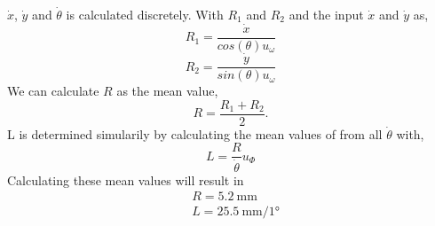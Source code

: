 \documentclass[a4paper,12pt,oneside,onecolumn]{article} %
\begin{document}
$\dot{x}$, $\dot{y}$ and $\dot{\theta}$ is calculated discretely. With
$R_1$ and $R_2$ and the input $\dot{x}$ and $\dot{y}$
as,
	\begin{equation}
		R_1 = \frac{\dot{x}}{cos(\theta)u_\omega}
	\end{equation}
	\begin{equation}
		R_2 = \frac{\dot{y}}{sin(\theta)u_\omega}
	\end{equation}
We can calculate $R$ as the mean value,
	\begin{equation}
		R = \frac{R_1 + R_2}{2}. %
	\end{equation}
L is determined simularily by calculating the mean values of from all
$\dot{\theta}$ with,
	\begin{equation}
		L =  \frac{R}{\dot{\theta}}u_\Phi
	\end{equation}
        Calculating these mean values will result in
	\begin{align*}
          &R = 5.2\ \si{\milli\meter} \\
          &L = 25.5\ \si{\milli\meter/\ang{1}}
	\end{align*}
\end{document}
